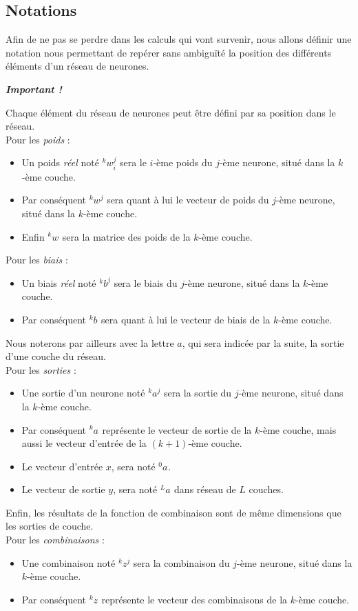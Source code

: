 \documentclass[10pt,a4paper]{report}
\newcommand{\lexp}[1]{\phantom{}^{#1}}
\newcommand{\elem}[4]{\lexp{#2}#1^{#3}_{#4}}
\begin{document}
		\subsection{Notations}
		Afin de ne pas se perdre dans les calculs qui vont survenir, nous allons définir une notation nous permettant de repérer sans ambiguïté la position des différents éléments d'un réseau de neurones.
		\begin{center}
		\emph{\textbf{Important !}}
		\end{center}
		Chaque élément du réseau de neurones peut être défini par sa position dans le réseau.\\
		Pour les \emph{poids} :
		\begin{itemize}
			\item Un poids \emph{réel} noté $\elem{w}{k}{j}{i}$ sera le $i$-ème poids du $j$-ème neurone, situé dans la $k$-ème couche.
			\item Par conséquent $\elem{w}{k}{j}{}$ sera quant à lui le vecteur de poids du $j$-ème neurone, situé dans la $k$-ème couche.
			\item Enfin $\elem{w}{k}{}{}$ sera la matrice des poids de la $k$-ème couche.\\
		\end{itemize}
		Pour les \emph{biais} :
		\begin{itemize}
			\item Un biais \emph{réel} noté $\elem{b}{k}{j}{}$ sera le biais du $j$-ème neurone, situé dans la $k$-ème couche.
			\item Par conséquent $\elem{b}{k}{}{}$ sera quant à lui le vecteur de biais de la $k$-ème couche.\\
		\end{itemize}
		Nous noterons par ailleurs avec la lettre $a$, qui sera indicée par la suite, la sortie d'une couche du réseau.\\
		Pour les \emph{sorties} :
		\begin{itemize}
			\item Une sortie d'un neurone noté $\elem{a}{k}{j}{}$ sera la sortie du $j$-ème neurone, situé dans la $k$-ème couche.
			\item Par conséquent $\elem{a}{k}{}{}$ représente le vecteur de sortie de la $k$-ème couche, mais aussi le vecteur d'entrée de la $(k+1)$-ème couche.
			\item Le vecteur d'entrée $x$, sera noté $\elem{a}{0}{}{}$.
			\item Le vecteur de sortie $y$, sera noté $\elem{a}{L}{}{}$ dans réseau de $L$ couches.\\
		\end{itemize}
		Enfin, les résultats de la fonction de combinaison sont de même dimensions que les sorties de couche.\\
		Pour les \emph{combinaisons} :
		\begin{itemize}
			\item Une combinaison noté $\elem{z}{k}{j}{}$ sera la combinaison du $j$-ème neurone, situé dans la $k$-ème couche.
			\item Par conséquent $\elem{z}{k}{}{}$ représente le vecteur des combinaisons de la $k$-ème couche.\\
		\end{itemize}
			
\end{document}
